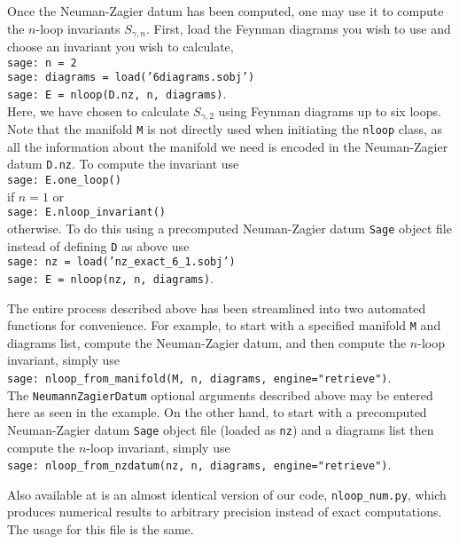 \documentclass[12pt]{amsart}
\theoremstyle{definition}
\begin{document}
Once the Neuman-Zagier datum has been computed, one may use it to 
compute the $n$-loop invariants $S_{\gamma,n}$. First, load the Feynman
diagrams you wish to use and choose an invariant you wish to calculate,\\
\indent \texttt{sage: n = 2}\\
\indent \texttt{sage: diagrams = load('6diagrams.sobj')}\\
\indent \texttt{sage: E = nloop(D.nz, n, diagrams)}.\\
Here, we have chosen to calculate $S_{\gamma,2}$ using Feynman
diagrams up to six loops. Note that the manifold \texttt{M} is not directly used when
initiating the \texttt{nloop} class, as all the information about the manifold we
need is encoded in the Neuman-Zagier datum \texttt{D.nz}. To compute the
invariant use\\
\indent \texttt{sage: E.one\_loop()}\\
if $n = 1$ or\\
\indent \texttt{sage: E.nloop\_invariant()}\\
otherwise. To do this using a precomputed Neuman-Zagier datum \texttt{Sage}
object file instead of defining \texttt{D} as above use\\
\indent \texttt{sage: nz = load('nz\_exact\_6\_1.sobj')}\\
\indent \texttt{sage: E = nloop(nz, n, diagrams)}.

The entire process described above has been streamlined into two automated
functions for convenience. For example, to start with a specified manifold 
\texttt{M} and diagrams list, compute the Neuman-Zagier datum, and then 
compute the $n$-loop invariant, simply use\\
\indent \texttt{sage: nloop\_from\_manifold(M, n, diagrams, 
engine="retrieve")}.\\
The \texttt{NeumannZagierDatum} optional arguments described above may be
entered here as seen in the example. On the other hand, to start with a
precomputed Neuman-Zagier datum \texttt{Sage} object file (loaded as 
\texttt{nz}) and a diagrams list then compute the $n$-loop invariant, simply 
use\\
\indent 
\texttt{sage: nloop\_from\_nzdatum(nz, n, diagrams,  engine="retrieve")}.

Also available at \cite{nloop-compute} is an almost identical version of our 
code, \texttt{nloop\_num.py}, which produces numerical results to arbitrary 
precision instead of exact computations. The usage for this file is the same.
\end{document}
